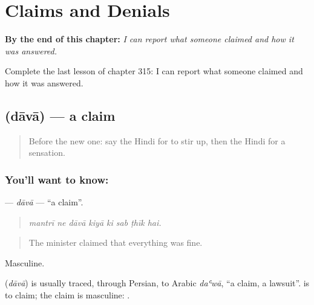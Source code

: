 
\chapter{Claims and Denials}
\label{ch:hi-claims-and-denials}

\begin{chapteropening}
\textbf{By the end of this chapter:} \emph{I can report what someone claimed and how it was answered.}

Complete the last lesson of chapter 315: I can report what someone claimed and how it was answered.
\end{chapteropening}

\section[\texorpdfstring{\hi{दावा} (dāvā)}{दावा (dāvā)}]{ (dāvā) — a claim}

\label{lesson:HI-C315-dava}



\begin{quote}
Before the new one: say the Hindi for to stir up, then the Hindi for a sensation.
\end{quote}

\subsection*{You'll want to know: }
\textbf{} — \emph{dāvā} — \textquotedblleft{}a claim\textquotedblright{}.

\begin{quote}
       
\end{quote}

\begin{quote}
\emph{mantrī ne dāvā kiyā ki sab ṭhīk hai.}
\end{quote}

\begin{quote}
The minister claimed that everything was fine.
\end{quote}

Masculine.

\begin{cousinweb}
\textbf{} (\emph{dāvā}) is usually traced, through Persian, to Arabic \emph{daʿwā}, \textquotedblleft{}a claim, a lawsuit\textquotedblright{}. \textbf{ } is to claim; the claim is masculine: \textbf{ }.
\end{cousinweb}

